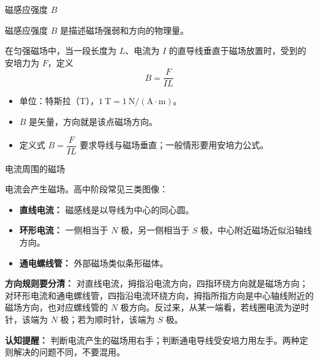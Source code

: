 \begin{conceptbox}{磁感应强度 $B$}

磁感应强度 $B$ 是描述磁场强弱和方向的物理量。

在匀强磁场中，当一段长度为 $L$、电流为 $I$ 的直导线垂直于磁场放置时，受到的安培力为 $F$，定义
\[
\boxed{B = \frac{F}{IL}}
\]

\begin{itemize}
  \item 单位：特斯拉（$\mathrm{T}$），$1\ \mathrm{T} = 1\ \mathrm{N/(A\cdot m)}$。
  \item $B$ 是矢量，方向就是该点磁场方向。
  \item 定义式 $B=\dfrac{F}{IL}$ 要求导线与磁场垂直；一般情形要用安培力公式。
\end{itemize}

\begin{center}


\label{fig:magnetic-field-symbols}
\end{center}

\end{conceptbox}

\begin{conceptbox}{电流周围的磁场}

电流会产生磁场。高中阶段常见三类图像：
\begin{itemize}
  \item \textbf{直线电流：} 磁感线是以导线为中心的同心圆。
  \item \textbf{环形电流：} 一侧相当于 $N$ 极，另一侧相当于 $S$ 极，中心附近磁场近似沿轴线方向。
  \item \textbf{通电螺线管：} 外部磁场类似条形磁体。
\end{itemize}

\begin{center}


\label{fig:current-magnetic-field}
\end{center}

\begin{center}


\label{fig:loop-solenoid-field}
\end{center}

\textbf{方向规则要分清：} 对直线电流，拇指沿电流方向，四指环绕方向就是磁场方向；对环形电流和通电螺线管，四指沿电流环绕方向，拇指所指方向是中心轴线附近的磁场方向，也对应螺线管的 $N$ 极方向。反过来，从某一端看，若线圈电流为逆时针，该端为 $N$ 极；若为顺时针，该端为 $S$ 极。

\textbf{认知提醒：} 判断电流产生的磁场用右手；判断通电导线受安培力用左手。两种定则解决的问题不同，不要混用。

\end{conceptbox}

